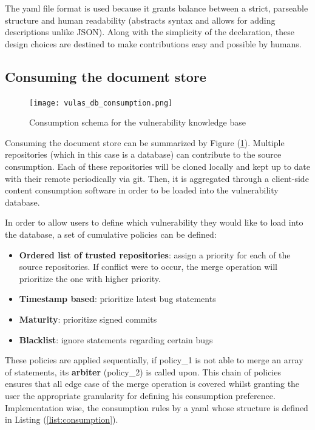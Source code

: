 \documentclass[11pt]{article}
\begin{document}
The yaml file format is used because it grants balance between a strict, parseable structure and human readability (abstracts syntax and allows for adding descriptions unlike JSON). Along with the simplicity of the declaration, these design choices are destined to make contributions easy and possible by humans.

\subsection{Consuming the document store}

\begin{figure}[h]
    \centering
    \texttt{[image: vulas\_db\_consumption.png]}
    \caption{Consumption schema for the vulnerability knowledge base}
    \label{fig:vulas_db_consumption}
\end{figure}

Consuming the document store can be summarized by Figure (\ref{fig:vulas_db_consumption}). Multiple repositories (which in this case is a database) can contribute to the source consumption. Each of these repositories will be cloned locally and kept up to date with their remote periodically via git. Then, it is aggregated through a client-side content consumption software in order to be loaded into the vulnerability database. 

In order to allow users to define which vulnerability they would like to load into the database, a set of cumulative policies can be defined:

\begin{itemize}
    \item \textbf{Ordered list of trusted repositories}: assign a priority for each of the source repositories. If conflict were to occur, the merge operation will prioritize the one with higher priority.
    \item \textbf{Timestamp based}: prioritize latest bug statements
    \item \textbf{Maturity}: prioritize signed commits
    \item \textbf{Blacklist}: ignore statements regarding certain bugs
\end{itemize}

These policies are applied sequentially, if policy\_1 is not able to merge an array of statements, its \textbf{arbiter} (policy\_2) is called upon. This chain of policies ensures that all edge case of the merge operation is covered whilst granting the user the appropriate granularity for defining his consumption preference. Implementation wise, the consumption rules by a yaml whose structure is defined in Listing (\ref{list:consumption}).
\end{document}
